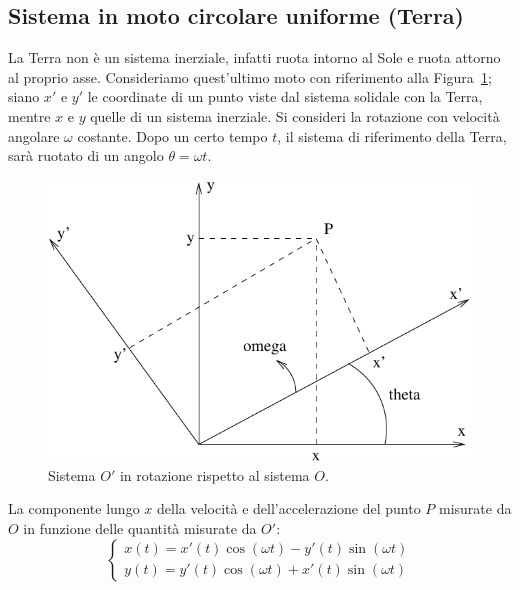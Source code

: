 \subsection{Sistema in moto circolare uniforme (Terra)}
La Terra non è un sistema inerziale, infatti ruota intorno al Sole e ruota attorno al proprio asse. Consideriamo quest'ultimo moto con riferimento alla Figura~\ref{fig:forze_apparenti_terra}; siano $x'$ e $y'$ le coordinate di un punto viste dal sistema solidale con la Terra, mentre $x$ e $y$ quelle di un sistema inerziale. Si consideri la rotazione con velocità angolare $\omega$ costante. Dopo un certo tempo $t$, il sistema di riferimento della Terra, sarà ruotato di un angolo $\theta=\omega t$.
\begin{figure}[tbp]
  \centering
  \includegraphics[scale=0.7]{immagini/fisica1/apparenti2}
  \caption{Sistema $O'$ in rotazione rispetto al sistema $O$.}
  \label{fig:forze_apparenti_terra}
\end{figure}

La componente lungo $x$ della velocità e dell'accelerazione del punto $P$ misurate da $O$ in funzione delle quantità misurate da $O'$:
\[\left\{\begin{array}{l}
    x(t)=x'(t)\cos(\omega t)-y'(t)\sin(\omega t) \\
    y(t)=y'(t)\cos(\omega t)+x'(t)\sin(\omega t)
  \end{array}\right.\]

